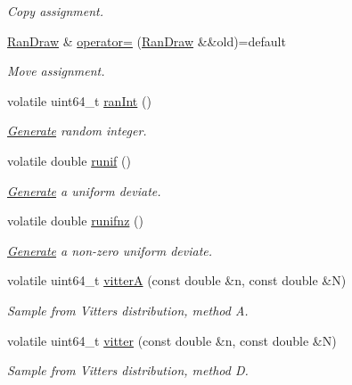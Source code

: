 \begin{DoxyCompactItemize}
\begin{DoxyCompactList}\small\item\em Copy assignment. \end{DoxyCompactList}\item 
\hyperlink{classvarfiles_1_1_ran_draw}{Ran\+Draw} \& \hyperlink{classvarfiles_1_1_ran_draw_a167eaea1db130c17f343a57e240ce91c}{operator=} (\hyperlink{classvarfiles_1_1_ran_draw}{Ran\+Draw} \&\&old)=default
\begin{DoxyCompactList}\small\item\em Move assignment. \end{DoxyCompactList}\item 
volatile uint64\+\_\+t \hyperlink{classvarfiles_1_1_ran_draw_a8a6157061c5851d9ac79fbf479b19535}{ran\+Int} ()
\begin{DoxyCompactList}\small\item\em \hyperlink{classvarfiles_1_1_generate}{Generate} random integer. \end{DoxyCompactList}\item 
volatile double \hyperlink{classvarfiles_1_1_ran_draw_a63126916400b75f8dead409118ee289c}{runif} ()
\begin{DoxyCompactList}\small\item\em \hyperlink{classvarfiles_1_1_generate}{Generate} a uniform deviate. \end{DoxyCompactList}\item 
volatile double \hyperlink{classvarfiles_1_1_ran_draw_a5688bd202e487435398b1c1cb6f9ce30}{runifnz} ()
\begin{DoxyCompactList}\small\item\em \hyperlink{classvarfiles_1_1_generate}{Generate} a non-\/zero uniform deviate. \end{DoxyCompactList}\item 
volatile uint64\+\_\+t \hyperlink{classvarfiles_1_1_ran_draw_a6319a7eac88ba9b4b54f67649121e3a7}{vitterA} (const double \&n, const double \&N)
\begin{DoxyCompactList}\small\item\em Sample from Vitter\textquotesingle{}s distribution, method A. \end{DoxyCompactList}\item 
volatile uint64\+\_\+t \hyperlink{classvarfiles_1_1_ran_draw_a2dcd2540f148c4fa271156a46640f701}{vitter} (const double \&n, const double \&N)
\begin{DoxyCompactList}\small\item\em Sample from Vitter\textquotesingle{}s distribution, method D. \end{DoxyCompactList}\end{DoxyCompactItemize}


